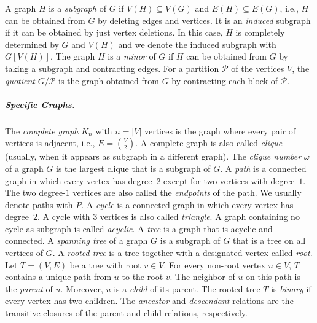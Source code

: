 A graph $H$ is a \emph{subgraph} of $G$ if $V(H) \subseteq V(G)$ and $E(H) \subseteq E(G)$, i.e., $H$ can be obtained from $G$ by deleting edges and vertices.
It is an \emph{induced} subgraph if it can be obtained by just vertex deletions.
In this case, $H$ is completely determined by $G$ and $V(H)$ and we denote the induced subgraph with $G[V(H)]$.
The graph $H$ is a \emph{minor} of $G$ if $H$ can be obtained from $G$ by taking a subgraph and contracting edges.
For a partition $\mathcal P$ of the vertices $V$, the \emph{quotient} $G / \mathcal P$ is the graph obtained from $G$ by contracting each block of $\mathcal P$.
%
%
\subparagraph{Specific Graphs.}
%
The \emph{complete graph} $K_n$ with $n = |V|$ vertices is the graph where every pair of vertices is adjacent, i.e., $E = \binom{V}{2}$.
A complete graph is also called \emph{clique} (usually, when it appears as subgraph in a different graph).
The \emph{clique number} $\omega$ of a graph $G$ is the largest clique that is a subgraph of $G$.
%
A \emph{path} is a connected graph in which every vertex has degree~$2$ except for two vertices with degree~$1$.
The two degree-$1$ vertices are also called the \emph{endpoints} of the path.
We usually denote paths with $P$.
A \emph{cycle} is a connected graph in which every vertex has degree~$2$.
A cycle with $3$ vertices is also called \emph{triangle}.
A graph containing no cycle as subgraph is called \emph{acyclic}.
A \emph{tree} is a graph that is acyclic and connected.
A \emph{spanning tree} of a graph $G$ is a subgraph of $G$ that is a tree on all vertices of $G$.
A \emph{rooted tree} is a tree together with a designated vertex called \emph{root}.
Let $T = (V, E)$ be a tree with root $v \in V$.
For every non-root vertex $u \in V$, $T$ contains a unique path from $u$ to the root $v$.
The neighbor of $u$ on this path is the \emph{parent} of $u$.
Moreover, $u$ is a \emph{child} of its parent.
The rooted tree $T$ is \emph{binary} if every vertex has two children.
The \emph{ancestor} and \emph{descendant} relations are the transitive closures of the parent and child relations, respectively.
%
%
%
